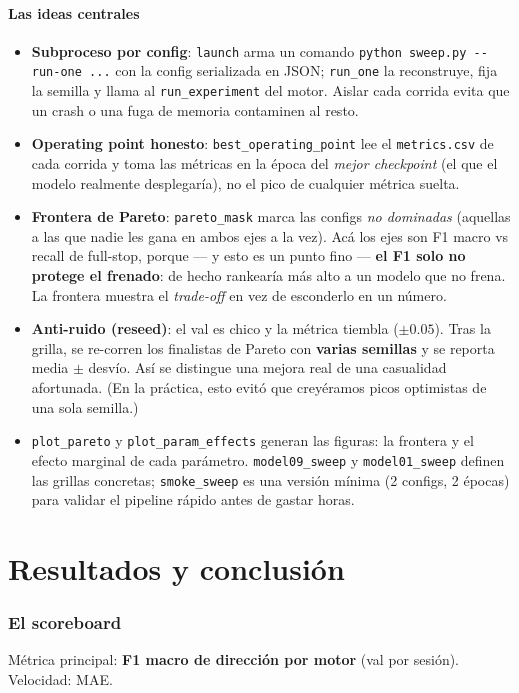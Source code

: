 \documentclass[11pt,a4paper]{article}
\newcommand{\code}[1]{\lstinline[basicstyle=\ttfamily\normalsize]|#1|}
\begin{document}
\subsection*{Las ideas centrales}
\begin{itemize}
  \item \textbf{Subproceso por config}: \code{launch} arma un comando \code{python sweep.py --run-one ...} con la
  config serializada en JSON; \code{run_one} la reconstruye, fija la semilla y llama al \code{run_experiment} del
  motor. Aislar cada corrida evita que un crash o una fuga de memoria contaminen al resto.
  \item \textbf{Operating point honesto}: \code{best_operating_point} lee el \code{metrics.csv} de cada corrida y
  toma las métricas en la época del \emph{mejor checkpoint} (el que el modelo realmente desplegaría), no el pico
  de cualquier métrica suelta.
  \item \textbf{Frontera de Pareto}: \code{pareto_mask} marca las configs \emph{no dominadas} (aquellas a las que
  nadie les gana en ambos ejes a la vez). Acá los ejes son F1 macro vs recall de full-stop, porque
  --- y esto es un punto fino --- \textbf{el F1 solo no protege el frenado}: de hecho rankearía más alto a un
  modelo que no frena. La frontera muestra el \emph{trade-off} en vez de esconderlo en un número.
  \item \textbf{Anti-ruido (reseed)}: el val es chico y la métrica tiembla ($\pm0.05$). Tras la grilla, se
  re-corren los finalistas de Pareto con \textbf{varias semillas} y se reporta media $\pm$ desvío. Así se
  distingue una mejora real de una casualidad afortunada. (En la práctica, esto evitó que creyéramos picos
  optimistas de una sola semilla.)
  \item \code{plot_pareto} y \code{plot_param_effects} generan las figuras: la frontera y el efecto marginal de
  cada parámetro. \code{model09_sweep} y \code{model01_sweep} definen las grillas concretas; \code{smoke_sweep}
  es una versión mínima (2 configs, 2 épocas) para validar el pipeline rápido antes de gastar horas.
\end{itemize}

\part{Resultados y conclusión}

\section{El scoreboard}
Métrica principal: \textbf{F1 macro de dirección por motor} (val por sesión). Velocidad: MAE.
\end{document}
